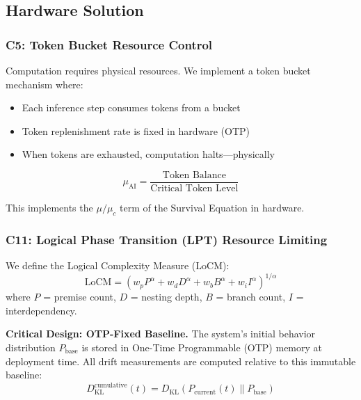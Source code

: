 \documentclass[11pt,a4paper]{article}
\newcommand{\muc}{\mu_c}
\newcommand{\DKL}{D_{\text{KL}}}
\begin{document}
\subsection{Hardware Solution}

\subsubsection{C5: Token Bucket Resource Control}

Computation requires physical resources.
We implement a token bucket mechanism where:
\begin{itemize}
    \item Each inference step consumes tokens from a bucket
    \item Token replenishment rate is fixed in hardware (OTP)
    \item When tokens are exhausted, computation halts---physically
\end{itemize}

\begin{equation}
\mu_{\text{AI}} = \frac{\text{Token Balance}}{\text{Critical Token Level}}
\end{equation}

This implements the $\mu/\muc$ term of the Survival Equation in hardware.

\subsubsection{C11: Logical Phase Transition (LPT) Resource Limiting}

We define the Logical Complexity Measure (LoCM):
\begin{equation}
\text{LoCM} = \left( w_p P^\alpha + w_d D^\alpha + w_b B^\alpha + w_i I^\alpha \right)^{1/\alpha}
\end{equation}
where $P$ = premise count, $D$ = nesting depth, $B$ = branch count, $I$ = interdependency.

\textbf{Critical Design: OTP-Fixed Baseline.} The system's initial behavior distribution $P_{\text{base}}$ is stored in One-Time Programmable (OTP) memory at deployment time.
All drift measurements are computed relative to this immutable baseline:
\begin{equation}
\DKL^{\text{cumulative}}(t) = \DKL(P_{\text{current}}(t) \| P_{\text{base}})
\label{eq:cumulative_baseline}
\end{equation}
\end{document}
